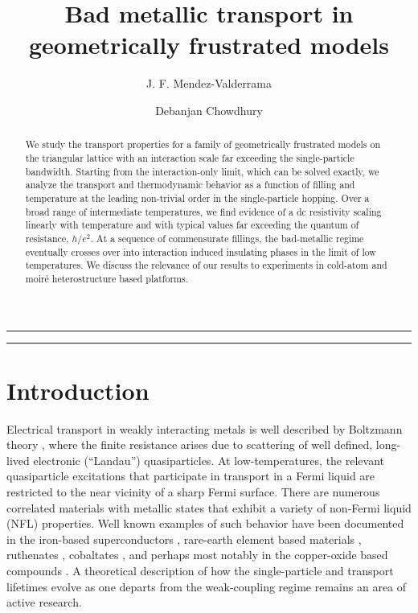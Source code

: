 \documentclass[aps,prx,onecolumn,amsmath,nofootinbib,amssymb,11pt]{revtex4-1}
\begin{document}
\title{\textsf{Bad metallic transport in geometrically frustrated models}}
\sffamily
\author{\textsf{J. F. Mendez-Valderrama}}
\author{\textsf{Debanjan Chowdhury}}


\begin{abstract}
We study the transport properties for a family of geometrically frustrated models on the triangular lattice with an interaction scale far exceeding the single-particle bandwidth. Starting from the interaction-only limit, which can be solved exactly, we analyze the transport and thermodynamic behavior as a function of filling and temperature at the leading non-trivial order in the single-particle hopping. Over a broad range of intermediate temperatures, we find evidence of a dc resistivity scaling linearly with temperature and with typical values far exceeding the quantum of resistance, $h/e^2$. At a sequence of commensurate fillings, the bad-metallic regime eventually crosses over into interaction induced insulating phases in the limit of low temperatures. We discuss the relevance of our results to experiments in cold-atom and  moir\'e heterostructure based platforms.  
\end{abstract}

\maketitle

\noindent\rule{\textwidth}{1pt}
\tableofcontents
\noindent\rule{\textwidth}{1pt}

\section{\textsf{Introduction}}
\label{sec:intro}

Electrical transport in weakly interacting metals is well described by Boltzmann theory \cite{ziman}, where the finite resistance arises due to scattering of well defined, long-lived electronic (``Landau'') quasiparticles. At low-temperatures, the relevant quasiparticle excitations that participate in transport in a Fermi liquid are restricted to the near vicinity of a sharp Fermi surface. There are numerous correlated materials with metallic states that exhibit a variety of non-Fermi liquid (NFL) properties. Well known examples of such behavior have been documented in the iron-based superconductors \cite{scalapino,Matsuda14}, rare-earth element based materials \cite{Stewart,rmpqcp}, ruthenates \cite{allen,Tyler1998,gegenwart}, cobaltates \cite{Taillefer1,Ong1}, and perhaps most notably in the copper-oxide based compounds \cite{Takagi,Keimer15}. A theoretical description of how the single-particle and transport lifetimes evolve as one departs from the weak-coupling regime remains an area of active research.  
\end{document}

